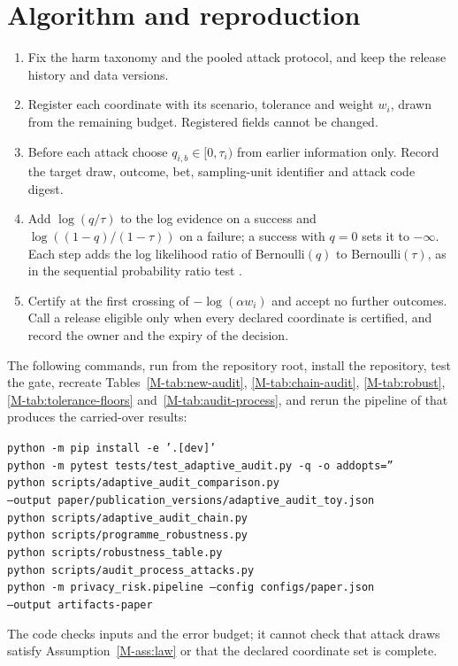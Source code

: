 \documentclass{jpc}
\begin{document}
\section{Algorithm and reproduction}\label{sec:s-algorithm}
\begin{enumerate}
\item Fix the harm taxonomy and the pooled attack protocol, and keep the release history and data versions.
\item Register each coordinate with its scenario, tolerance and weight $w_i$, drawn from the remaining budget. Registered fields cannot be changed.
\item Before each attack choose $q_{i,b}\in[0,\tau_i)$ from earlier information only. Record the target draw, outcome, bet, sampling-unit identifier and attack code digest.
\item Add $\log(q/\tau)$ to the log evidence on a success and $\log((1-q)/(1-\tau))$ on a failure; a success with $q=0$ sets it to $-\infty$. Each step adds the log likelihood ratio of Bernoulli$(q)$ to Bernoulli$(\tau)$, as in the sequential probability ratio test \cite{wald1945}.
\item Certify at the first crossing of $-\log(\alpha w_i)$ and accept no further outcomes. Call a release eligible only when every declared coordinate is certified, and record the owner and the expiry of the decision.
\end{enumerate}

The following commands, run from the repository root, install the repository, test the gate, recreate Tables~\ref{M-tab:new-audit}, \ref{M-tab:chain-audit}, \ref{M-tab:robust}, \ref{M-tab:tolerance-floors} and~\ref{M-tab:audit-process}, and rerun the pipeline of \cite{mahomane2026} that produces the carried-over results:
\begin{flushleft}\small
\texttt{python -m pip install -e '.[dev]'}\\
\texttt{python -m pytest tests/test\_adaptive\_audit.py -q -o addopts=''}\\
\texttt{python scripts/adaptive\_audit\_comparison.py}\\
\quad\texttt{--output paper/publication\_versions/adaptive\_audit\_toy.json}\\
\texttt{python scripts/adaptive\_audit\_chain.py}\\
\texttt{python scripts/programme\_robustness.py}\\
\texttt{python scripts/robustness\_table.py}\\
\texttt{python scripts/audit\_process\_attacks.py}\\
\texttt{python -m privacy\_risk.pipeline --config configs/paper.json}\\
\quad\texttt{--output artifacts-paper}
\end{flushleft}
The code checks inputs and the error budget; it cannot check that attack draws satisfy Assumption~\ref{M-ass:law} or that the declared coordinate set is complete.
\end{document}
